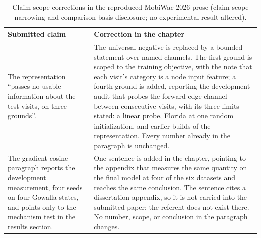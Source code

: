 \begin{table}[htb]
\caption{Claim-scope corrections in the reproduced MobiWac 2026 prose (claim-scope
narrowing and comparison-basis disclosure; no experimental result altered).}
\label{tab:apx:mobiwac-scope}
\centering
\small
\begin{tabular}{@{}p{}p{}@{}}
\toprule
\textbf{Submitted claim} & \textbf{Correction in the chapter} \\
\midrule
The representation ``passes no usable information about the test visits, on three
grounds''. &
The universal negative is replaced by a bounded statement over named channels. The first
ground is scoped to the training objective, with the note that each visit's category is a
node input feature; a fourth ground is added, reporting the development audit that probes
the forward-edge channel between consecutive visits, with its three limits stated: a
linear probe, Florida at one random initialization, and earlier builds of the
representation. Every number already in the paragraph is unchanged. \\
\addlinespace
The gradient-cosine paragraph reports the development measurement, four seeds on four
Gowalla states, and points only to the mechanism test in the results section. &
One sentence is added in the chapter, pointing to the appendix that measures the same
quantity on the final model at four of the six datasets and reaches the same conclusion. The
sentence cites a dissertation appendix, so it is not carried into the submitted paper: the
referent does not exist there. No number, scope, or conclusion in the paragraph changes. \\
\bottomrule
\end{tabular}
\end{table}
